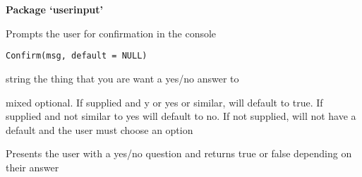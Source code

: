 \documentclass[a4paper]{book}
\begin{document}
\chapter*{}
\begin{center}
{\textbf{\huge Package `userinput'}}
\par\bigskip{\large \today}
\end{center}
\begin{description}
\raggedright{}
\item[Type]
\item[Title]
\item[Version]
\item[Author]\AsIs{}
\item[Maintainer]\AsIs{}
\item[Description]
\item[License]
\item[LazyData]
\item[RoxygenNote]
\end{description}
%
\begin{Description}\relax
Prompts the user for confirmation in the console
\end{Description}
%
\begin{Usage}
\begin{verbatim}
Confirm(msg, default = NULL)
\end{verbatim}
\end{Usage}
%
\begin{Arguments}
\begin{ldescription}
\item[\code{msg}] string the thing that you are want a yes/no answer to

\item[\code{default}] mixed optional. If supplied and y or yes or similar, will default to true.
If supplied and not similar to yes will default to no.
If not supplied, will not have a default and the user must choose an option
\end{ldescription}
\end{Arguments}
%
\begin{Details}\relax
Presents the user with a yes/no question and returns true or false depending on their answer
\end{Details}
\end{document}
